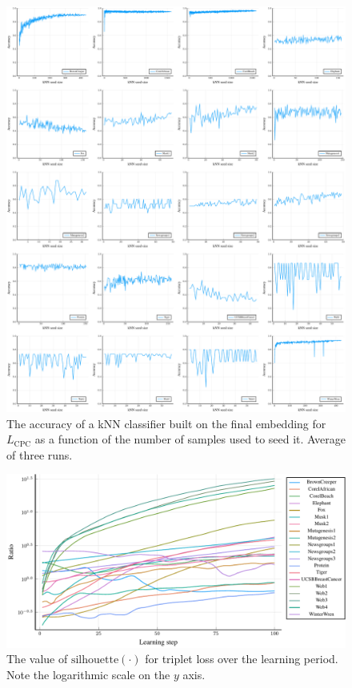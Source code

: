 \begin{figure}[h]
  \centering
  \includegraphics[width=\textwidth]{images/CPC-toy/kNN/CPC-toy-kNN.pdf}
  \caption{The accuracy of a kNN classifier built on the final embedding for \( L_\mathrm{CPC} \) as a function of the number of samples used to seed it. Average of three runs.}\label{fig:CPC-toy-kNN}
\end{figure}

\begin{figure}[h]
  \centering
  \includegraphics[width=\textwidth]{images/triplet-toy/ratio/triplet-toy-ratio.pdf}
  \caption{The value of \( \mathrm{silhouette} \left( \cdot \right) \) for triplet loss over the learning period. Note the logarithmic scale on the \( y \) axis.}\label{fig:triplet-toy-ratio}
\end{figure}

